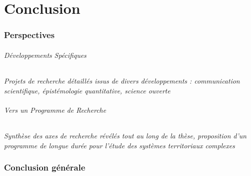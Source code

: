 \part*{Conclusion}


\section*{Perspectives}

\paragraph{Développements Spécifiques}


\textit{Projets de recherche détaillés issus de divers développements : communication scientifique, épistémologie quantitative, science ouverte}


\paragraph{Vers un Programme de Recherche}

\textit{Synthèse des axes de recherche révélés tout au long de la thèse, proposition d'un programme de longue durée pour l'étude des systèmes territoriaux complexes}



\section*{Conclusion générale}







